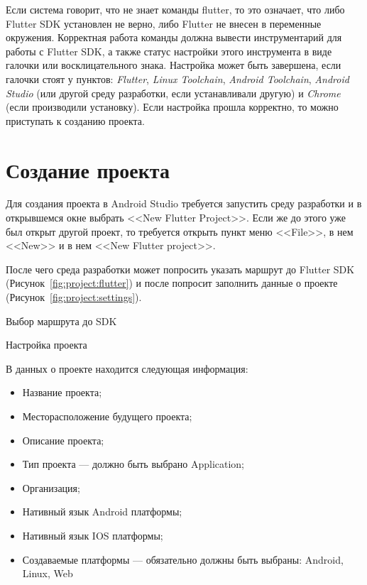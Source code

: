 Если система говорит, что не знает команды flutter,
то это означает, что либо Flutter SDK установлен не верно,
либо Flutter не внесен в переменные окружения.
Корректная работа команды должна вывести инструментарий
для работы с Flutter SDK,
а также статус настройки этого инструмента в виде галочки
или восклицательного знака. Настройка может быть завершена,
если галочки стоят у пунктов: \textit{Flutter}, \textit{Linux Toolchain},
\textit{Android Toolchain}, \textit{Android Studio}
(или другой среду разработки, если устанавливали другую)
и \textit{Chrome} (если производили установку).
Если настройка прошла корректно, то можно приступать к созданию проекта.

\section{Создание проекта}

Для создания проекта в Android Studio требуется запустить среду разработки
и в открывшемся окне выбрать <<New Flutter Project>>.
Если же до этого уже был открыт другой проект,
то требуется открыть пункт меню <<File>>, в нем <<New>>
и в нем <<New Flutter project>>.\par
После чего среда разработки может попросить указать маршрут
до Flutter SDK (Рисунок~\ref{fig:project:flutter})
и после попросит заполнить данные о проекте
(Рисунок~\ref{fig:project:settings}).

\begin{image}
	\caption{Выбор маршрута до SDK}
	\label{fig:project:flutter}
\end{image}

\begin{image}
	\caption{Настройка проекта}
	\label{fig:project:settings}
\end{image}

В данных о проекте находится следующая информация:

\begin{itemize}
	\item Название проекта;
	\item Месторасположение будущего проекта;
	\item Описание проекта;
	\item Тип проекта --- должно быть выбрано Application;
	\item Организация;
	\item Нативный язык Android платформы;
	\item Нативный язык IOS платформы;
	\item Создаваемые платформы --- обязательно должны быть выбраны:
		Android, Linux, Web
\end{itemize}

